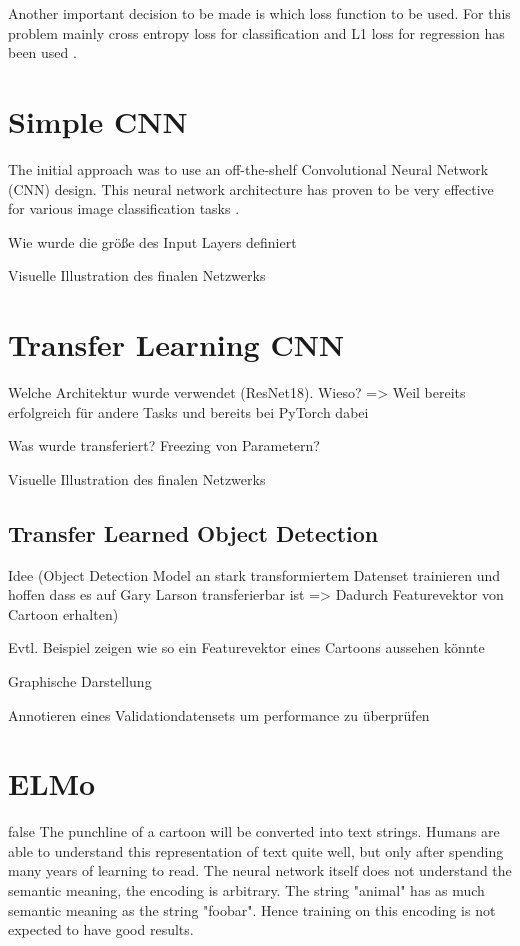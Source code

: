 \documentclass[draft,final,oneside]{vutinfth} %
\begin{document}
Another important decision to be made is which loss function to be used. For this problem mainly cross entropy loss for classification and L1 loss for regression has been used \cite{crossentropyloss} \cite{lossfunctions}.

\section{Simple CNN}

The initial approach was to use an off-the-shelf Convolutional Neural Network (CNN) design. This neural network architecture has proven to be very effective for various image classification tasks \cite{dogsvscats}.

Wie wurde die größe des Input Layers definiert

Visuelle Illustration des finalen Netzwerks

\section{Transfer Learning CNN}

Welche Architektur wurde verwendet (ResNet18). Wieso? => Weil bereits erfolgreich für andere Tasks und bereits bei PyTorch dabei

Was wurde transferiert? Freezing von Parametern?

Visuelle Illustration des finalen Netzwerks

\subsection{Transfer Learned Object Detection}

Idee (Object Detection Model an stark transformiertem Datenset trainieren und hoffen dass es auf Gary Larson transferierbar ist => Dadurch Featurevektor von Cartoon erhalten)

Evtl. Beispiel zeigen wie so ein Featurevektor eines Cartoons aussehen könnte

Graphische Darstellung

Annotieren eines Validationdatensets um performance zu überprüfen

\section{ELMo}

\if false
The punchline of a cartoon will be converted into text strings. Humans are able to understand this representation of text quite well, but only after spending many years of learning to read. The neural network itself does not understand the semantic meaning, the encoding is arbitrary. The string "animal" has as much semantic meaning as the string "foobar". Hence training on this encoding is not expected to have good results. \\
\end{document}
